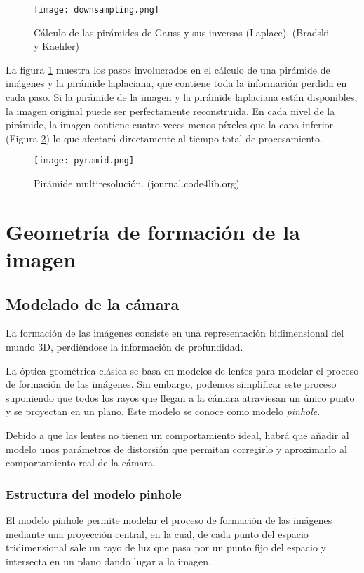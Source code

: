 \begin{figure}[h!] 
  \centering
  \texttt{[image: downsampling.png]}
  \caption{Cálculo de las pirámides de Gauss y sus inversas (Laplace). (Bradski y Kaehler)}

  \label{fig:pirámides}
\end{figure}

La figura \ref{fig:pirámides} muestra los pasos involucrados en el cálculo de una pirámide de imágenes y la pirámide laplaciana, que contiene toda la información perdida en cada paso. Si la pirámide de la imagen y la pirámide laplaciana están disponibles, la imagen original puede ser perfectamente reconstruida. En cada nivel de la pirámide, la imagen contiene cuatro veces menos píxeles que la capa inferior (Figura \ref{fig:pirescale}) lo que afectará directamente al tiempo total de procesamiento. 

\begin{figure}[h!]
  \centering
  \texttt{[image: pyramid.png]}
  \caption{Pirámide multiresolución. (journal.code4lib.org)}
  \label{fig:pirescale}
\end{figure}

\section{Geometría de formación de la imagen}
\subsection{Modelado de la cámara}
La formación de las imágenes consiste en una representación bidimensional del mundo 3D, perdiéndose la información de profundidad.

La óptica geométrica clásica se basa en modelos de lentes para modelar el proceso de formación de las imágenes. Sin embargo, podemos simplificar este proceso suponiendo que todos los rayos que llegan a la cámara atraviesan un único punto y se proyectan en un plano. Este modelo se conoce como modelo \emph{pinhole}. 

Debido a que las lentes no tienen un comportamiento ideal, habrá que añadir al modelo unos parámetros de distorsión que permitan corregirlo y aproximarlo al comportamiento real de la cámara.

\subsubsection{Estructura del modelo pinhole}
El modelo pinhole \cite{Hartley} permite modelar el proceso de formación de las imágenes mediante una proyección central, en la cual, de cada punto del espacio tridimensional sale un rayo de luz que pasa por un punto fijo del espacio y intersecta en un plano dando lugar a la imagen.

